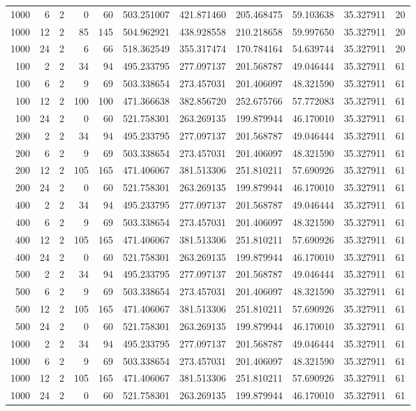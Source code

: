 \begin{table}
\begin{tabular}{rrrrrrrrrrr}
1000 & 6 & 2 & 0 & 60 & 503.251007 & 421.871460 & 205.468475 & 59.103638 & 35.327911 & 20 \\
1000 & 12 & 2 & 85 & 145 & 504.962921 & 438.928558 & 210.218658 & 59.997650 & 35.327911 & 20 \\
1000 & 24 & 2 & 6 & 66 & 518.362549 & 355.317474 & 170.784164 & 54.639744 & 35.327911 & 20 \\
100 & 2 & 2 & 34 & 94 & 495.233795 & 277.097137 & 201.568787 & 49.046444 & 35.327911 & 61 \\
100 & 6 & 2 & 9 & 69 & 503.338654 & 273.457031 & 201.406097 & 48.321590 & 35.327911 & 61 \\
100 & 12 & 2 & 100 & 100 & 471.366638 & 382.856720 & 252.675766 & 57.772083 & 35.327911 & 61 \\
100 & 24 & 2 & 0 & 60 & 521.758301 & 263.269135 & 199.879944 & 46.170010 & 35.327911 & 61 \\
200 & 2 & 2 & 34 & 94 & 495.233795 & 277.097137 & 201.568787 & 49.046444 & 35.327911 & 61 \\
200 & 6 & 2 & 9 & 69 & 503.338654 & 273.457031 & 201.406097 & 48.321590 & 35.327911 & 61 \\
200 & 12 & 2 & 105 & 165 & 471.406067 & 381.513306 & 251.810211 & 57.690926 & 35.327911 & 61 \\
200 & 24 & 2 & 0 & 60 & 521.758301 & 263.269135 & 199.879944 & 46.170010 & 35.327911 & 61 \\
400 & 2 & 2 & 34 & 94 & 495.233795 & 277.097137 & 201.568787 & 49.046444 & 35.327911 & 61 \\
400 & 6 & 2 & 9 & 69 & 503.338654 & 273.457031 & 201.406097 & 48.321590 & 35.327911 & 61 \\
400 & 12 & 2 & 105 & 165 & 471.406067 & 381.513306 & 251.810211 & 57.690926 & 35.327911 & 61 \\
400 & 24 & 2 & 0 & 60 & 521.758301 & 263.269135 & 199.879944 & 46.170010 & 35.327911 & 61 \\
500 & 2 & 2 & 34 & 94 & 495.233795 & 277.097137 & 201.568787 & 49.046444 & 35.327911 & 61 \\
500 & 6 & 2 & 9 & 69 & 503.338654 & 273.457031 & 201.406097 & 48.321590 & 35.327911 & 61 \\
500 & 12 & 2 & 105 & 165 & 471.406067 & 381.513306 & 251.810211 & 57.690926 & 35.327911 & 61 \\
500 & 24 & 2 & 0 & 60 & 521.758301 & 263.269135 & 199.879944 & 46.170010 & 35.327911 & 61 \\
1000 & 2 & 2 & 34 & 94 & 495.233795 & 277.097137 & 201.568787 & 49.046444 & 35.327911 & 61 \\
1000 & 6 & 2 & 9 & 69 & 503.338654 & 273.457031 & 201.406097 & 48.321590 & 35.327911 & 61 \\
1000 & 12 & 2 & 105 & 165 & 471.406067 & 381.513306 & 251.810211 & 57.690926 & 35.327911 & 61 \\
1000 & 24 & 2 & 0 & 60 & 521.758301 & 263.269135 & 199.879944 & 46.170010 & 35.327911 & 61 \\
\bottomrule
\end{tabular}
\end{table}
